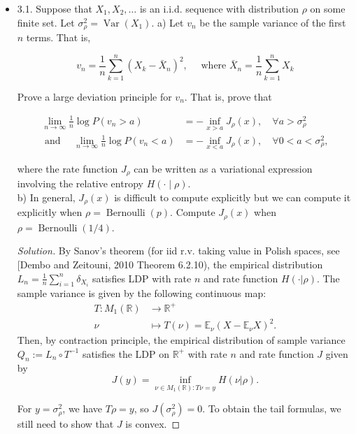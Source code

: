 
\begin{itemize}
	\item 3.1. Suppose that $X_1, X_2, \ldots$ is an i.i.d. sequence with distribution $\rho$ on some finite set. Let $\sigma_\rho^2=\operatorname{Var}\left(X_1\right)$.
a) Let $v_n$ be the sample variance of the first $n$ terms. That is,

\[
v_n=\frac{1}{n} \sum_{k=1}^n\left(X_k-\bar{X}_n\right)^2, \quad \text { where } \bar{X}_n=\frac{1}{n} \sum_{k=1}^n X_k
\]


Prove a large deviation principle for $v_n$. That is, prove that

\[
\begin{aligned}
\lim _{n \rightarrow \infty} \frac{1}{n} \log P\left(v_n>a\right) & =-\inf _{x>a} J_\rho(x), \quad \forall a>\sigma_\rho^2 \\
\text { and } \quad \lim _{n \rightarrow \infty} \frac{1}{n} \log P\left(v_n<a\right) & =-\inf _{x<a} J_\rho(x), \quad \forall 0<a<\sigma_\rho^2,
\end{aligned}
\]

where the rate function $J_\rho$ can be written as a variational expression involving the relative entropy $H(\cdot \mid \rho)$.
\\
b) In general, $J_\rho(x)$ is difficult to compute explicitly but we can compute it explicitly when $\rho=\operatorname{Bernoulli}(p)$. Compute $J_\rho(x)$ when $\rho=\operatorname{Bernoulli}(1 / 4)$.

\begin{proof}[Solution]
	By Sanov's theorem (for iid r.v. taking value in Polish spaces, see [Dembo and Zeitouni, 2010 Theorem 6.2.10), the empirical distribution  $L_n = \frac{1}{n} \sum_{i = 1}^n \delta_{X_i}$ satisfies LDP with rate $n$ and rate function $H(\cdot  | \rho)$. The sample variance is given by the following continuous map:
	\begin{align*}
		T: M_1(\mathbb{R}) &\longrightarrow \mathbb{R}^+ \\
		\nu &\longmapsto T(\nu) = \mathbb{E}_\nu (X - \mathbb{E}_ \nu X)^2
	.\end{align*}
	Then, by contraction principle, the empirical distribution of sample variance $Q_n := L_n \circ T^{-1}$ satisfies the LDP on $\mathbb{R}^+$ with rate  $n$ and rate function $J$ given by
	\[
		J(y) = \inf _{\nu \in M_1(\mathbb{R}): T \nu = y} H(\nu | \rho)
	.\] 

	For $y = \sigma_\rho^2$, we have $T \rho = y$, so $J(\sigma_\rho^2) = 0$. To obtain the tail formulas, we still need to show that $J$ is convex.


\end{proof}
\end{itemize}
